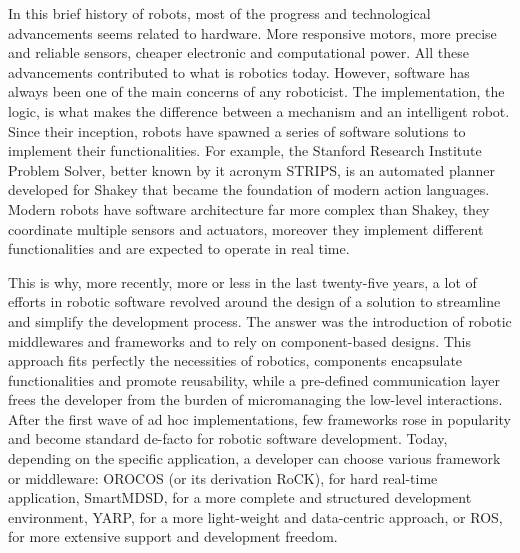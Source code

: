 In this brief history of robots, most of the progress and technological advancements seems related to hardware. More responsive motors, more precise and reliable sensors, cheaper electronic and computational power. All these advancements contributed to what is robotics today. However, software has always been one of the main concerns of any roboticist. The implementation, the logic, is what makes the difference between a mechanism and an intelligent robot. Since their inception, robots have spawned a series of software solutions to implement their functionalities. For example, the Stanford Research Institute Problem Solver, better known by it acronym STRIPS, is an automated planner developed for Shakey that became the foundation of modern action languages. Modern robots have software architecture far more complex than Shakey, they coordinate multiple sensors and actuators, moreover they implement different functionalities and are expected to operate in real time.

This is why, more recently, more or less in the last twenty-five years, a lot of efforts in robotic software revolved around the design of a solution to streamline and simplify the development process. The answer was the introduction of robotic middlewares and frameworks and to rely on component-based designs. This approach fits perfectly the necessities of robotics, components encapsulate functionalities and promote reusability, while a pre-defined communication layer frees the developer from the burden of micromanaging the low-level interactions. After the first wave of ad hoc implementations, few frameworks rose in popularity and become standard de-facto for robotic software development. Today, depending on the specific application, a developer can choose various framework or middleware: OROCOS (or its derivation RoCK), for hard real-time application, SmartMDSD, for a more complete and structured development environment, YARP, for a more light-weight and data-centric approach, or ROS, for more extensive support and development freedom.

